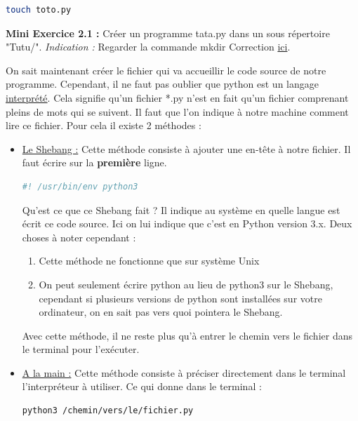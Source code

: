 \documentclass[a4paper,12pt]{article}
\begin{document}
\begin{lstlisting}[language=bash]
touch toto.py
\end{lstlisting}

{\color{darkgreen}
\noindent\textbf{Mini Exercice 2.1 : } Créer un programme tata.py dans un sous répertoire "Tutu/". \newline
\textit{Indication : } Regarder la commande mkdir \newline
Correction \hyperlink{AncreExo2.1}{ici}.\newline
}

On sait maintenant créer le fichier qui va accueillir le code source de notre programme. Cependant, il ne faut pas oublier que python est un langage \underline{interprété}.
Cela signifie qu'un fichier *.py n'est en fait qu'un fichier comprenant pleins de mots qui se suivent. Il faut que l'on indique à notre machine comment lire ce fichier.
Pour cela il existe 2 méthodes : 
\begin{itemize}
    \item \underline{Le Shebang :} Cette méthode consiste à ajouter une en-tête à notre fichier. Il faut écrire sur la \textbf{première} ligne. 
        \begin{lstlisting}[language=python]
    #! /usr/bin/env python3
        \end{lstlisting}
        Qu'est ce que ce Shebang fait ? Il indique au système en quelle langue est écrit ce code source. Ici on lui indique que c'est en Python version 3.x. 
        Deux choses à noter cependant : 
        \begin{enumerate}
            \item Cette méthode ne fonctionne que sur système Unix
            \item On peut seulement écrire python au lieu de python3 sur le Shebang, cependant si plusieurs versions de python sont installées sur votre ordinateur, on en sait pas vers quoi pointera le Shebang.
        \end{enumerate}
        Avec cette méthode, il ne reste plus qu'à entrer le chemin vers le fichier dans le terminal pour l'exécuter.
    \item \underline{A la main :} Cette méthode consiste à préciser directement dans le terminal l'interpréteur à utiliser. 
        Ce qui donne dans le terminal :
        \begin{lstlisting}[language=bash]
    python3 /chemin/vers/le/fichier.py
        \end{lstlisting}
\end{itemize}
\end{document}
